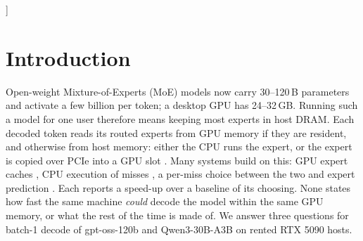 \begin{abstract}
A Mixture-of-Experts model too large for one consumer GPU keeps most of its experts in host memory, and decoding one
token at a time then waits on host reads. We ask how fast such decoding could be on a given machine, where the rest of
the time goes, and what knowing the future routing is worth. Two lower bounds follow from the fewest host reads any
cache of $C$ experts per layer can make (Belady's MIN with bypass) and the machine's measured read rates. On
\slAllMachines{} rented RTX 5090 machines, our llama.cpp expert cache takes the GPU's profiled compute plus its host
reads at the machine's best rate, with nothing fitted; its gap to the bound is that serialisation plus the reads MIN
would not make. Oracles inside the engine show that foresight pays when spent as MIN spends it, and that among MIN's
equally good schedules the one with the fewest admissions also wins where the PCIe link is slow. %
Half of MIN's saving over admitting every miss needs the routing of about \dcMed$\,C$ distinct experts per layer ahead,
which no forecaster we tested approaches.
\end{abstract}
]
\printAffiliationsAndNotice{}

\section{Introduction}
Open-weight Mixture-of-Experts (MoE) models now carry 30--120\,B parameters and activate a few billion per token; a
desktop GPU has 24--32\,GB. Running such a model for one user therefore means keeping most experts in host DRAM. Each
decoded token reads its routed experts from GPU memory if they are resident, and otherwise from host memory: either the
CPU runs the expert, or the expert is copied over PCIe into a GPU slot \citep{ivanov2021datamovement,hoefler2021sparsity}.
Many systems build on this: GPU expert caches \citep{eliseev2023offloading,xue2024moeinfinity,song2024promoe}, CPU
execution of misses \citep{kamahori2024fiddler,ktransformers,zhong2025hybrimoe}, a per-miss choice between the
two \citep{freetoken,dali2026} and expert prediction \citep{hwang2024pregated,zhu2025preattention,wang2026seqmoe}. Each
reports a speed-up over a baseline of its choosing. None states how fast the same machine \emph{could} decode the model
within the same GPU memory, or what the rest of the time is made of. We answer three questions for batch-1 decode of
gpt-oss-120b \citep{openai2025gptoss} and Qwen3-30B-A3B \citep{yang2025qwen3} on rented RTX 5090 hosts.

